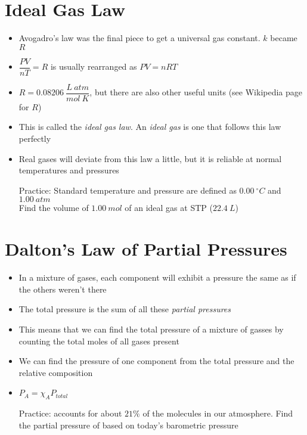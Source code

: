 \documentclass[12pt, openany, letterpaper]{memoir}
\begin{document}
\section{Ideal Gas Law}
\begin{itemize}
	\item Avogadro's law was the final piece to get a universal gas constant. $k$ became $R$
	\item $\dfrac{PV}{nT}=R$ is usually rearranged as $PV=nRT$
	\item $R=0.08206~\dfrac{L~atm}{mol~K}$, but there are also other useful units (see Wikipedia page for $R$)
	\item This is called the \emph{ideal gas law}. An \emph{ideal gas} is one that follows this law perfectly
	\item Real gases will deviate from this law a little, but it is reliable at normal temperatures and pressures

	      Practice: Standard temperature and pressure are defined as $0.00~^\circ C$ and $1.00~atm$\\
	      Find the volume of $1.00~mol$ of an ideal gas at STP ($22.4~L$)
\end{itemize}
\section{Dalton's Law of Partial Pressures}
\begin{itemize}
	\item In a mixture of gases, each component will exhibit a pressure the same as if the others weren't there
	\item The total pressure is the sum of all these \emph{partial pressures}
	\item This means that we can find the total pressure of a mixture of gasses by counting the total moles of all gases present
	\item We can find the pressure of one component from the total pressure and the relative composition
	\item $P_A=\chi_A P_{total}$

	      Practice:  accounts for about $21\%$ of the molecules in our atmosphere. Find the partial pressure of  based on today's barometric pressure
\end{itemize}
\end{document}
